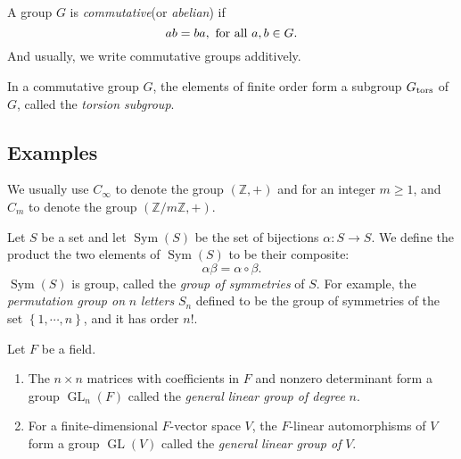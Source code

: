 \begin{definition}
  A group \( G \) is \emph{commutative}(or \emph{abelian}) if
  \[
    ab = ba, \textmd{ for all } a, b \in G.
  \]
  And usually, we write commutative groups additively.
\end{definition}

\begin{definition}
  In a commutative group \( G \), the elements of finite order form a subgroup \( G_{\textmd{tors}} \) of \( G \), called the \emph{torsion subgroup}.
\end{definition}

\subsection{Examples}

\begin{example}
  We usually use \( C_\infty \) to denote the group \( ( \mathbb{Z}, + ) \) and
  for an integer \( m \geq 1 \), and \( C_m \) to denote the group \((\mathbb{Z}
  / m \mathbb{Z}, +)\).
\end{example}

\begin{example}
  Let \( S \) be a set and let \( \operatorname{Sym}(S) \) be the set of bijections \( \alpha: S \to S \).
  We define the product the two elements of \( \operatorname{Sym}(S) \) to be their composite:
  \[
    \alpha \beta = \alpha \circ \beta.
  \]
  \( \operatorname{Sym}(S) \) is group, called the \emph{group of symmetries} of \( S \).
  For example, the \emph{permutation group on } \( n \)  \emph{letters} \( S_n \) defined to be the group of symmetries of the set \( \left\lbrace 1,\cdots, n\right\rbrace \), and it has order \( n! \).
\end{example}

\begin{example}
  Let \( F \) be a field.
  \begin{enumerate}
    \item The \( n \times n \) matrices with coefficients in \( F \) and nonzero determinant form a group \( \operatorname{GL}_n(F) \) called the \emph{general linear group of degree} \( n \).
    \item For a finite-dimensional \( F \)-vector space \( V \), the \( F \)-linear automorphisms of \( V \) form a group \( \operatorname{GL}(V) \) called the \emph{general linear group of} \( V \).
  \end{enumerate}
\end{example}

